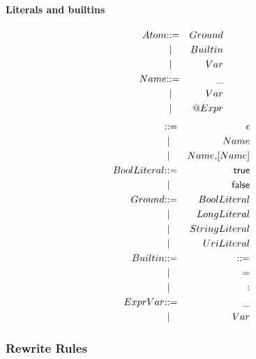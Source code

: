 \paragraph{Literals and builtins}
\begin{eqnarray*}
  Atom & \bc & Ground \\
  & \;\bm \; & Builtin \\
  & \;\bm \; & Var \\
  Name & \bc & \mathsf{\_} \\
  & \;\bm \; & Var \\
  & \;\bm \; & \mathsf{@} Expr
\end{eqnarray*}
\begin{eqnarray*}  
  [Name] & \bc & \epsilon \\
  & \;\bm \; & Name \\
  & \;\bm \; & Name \mathsf{,} [Name] \\
  BoolLiteral & \bc & \mathsf{true} \\
 & \;\bm \; & \mathsf{false} \\
  Ground & \bc & BoolLiteral \\
  & \;\bm \; & LongLiteral \\
  & \;\bm \; & StringLiteral \\
  & \;\bm \; & UriLiteral \\
  Builtin & \bc & \mathsf{\bc} \\
 & \;\bm \; & \mathsf{=} \\
 & \;\bm \; & \mathsf{:} \\
  ExprVar & \bc & \mathsf{\_} \\
  & \;\bm \; & Var \\
\end{eqnarray*}

\subsubsection{Rewrite Rules}

\begin{mathpar}
\end{mathpar}


